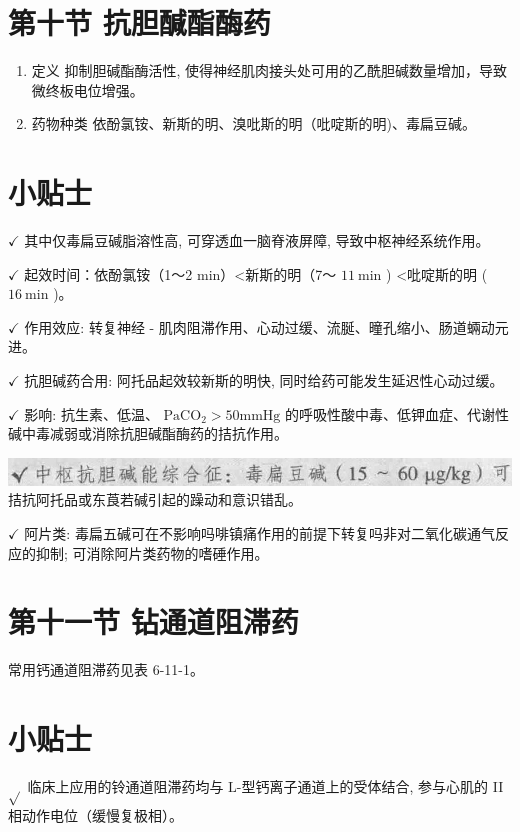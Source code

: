 \documentclass[10pt]{article}
\begin{document}
\section*{第十节 抗胆醎酯酶药}
\begin{enumerate}
  \item 定义 抑制胆碱酯酶活性, 使得神经肌肉接头处可用的乙酰胆碱数量增加，导致微终板电位增强。

  \item 药物种类 依酚氯铵、新斯的明、溴吡斯的明（吡啶斯的明)、毒扁豆碱。

\end{enumerate}

\section*{小贴士}
$\checkmark$ 其中仅毒扁豆碱脂溶性高, 可穿透血一脑脊液屏障, 导致中枢神经系统作用。

$\checkmark$ 起效时间：依酚氯铵（1～2 min）<新斯的明（7～ $11 \mathrm{~min}$ ) <吡啶斯的明 ( $16 \mathrm{~min}$ )。

$\checkmark$ 作用效应: 转复神经 - 肌肉阻滞作用、心动过缓、流脠、曈孔缩小、肠道蜽动元进。

$\checkmark$ 抗胆碱药合用: 阿托品起效较新斯的明快, 同时给药可能发生延迟性心动过缓。

$\checkmark$ 影响: 抗生素、低温、 $\mathrm{PaCO}_{2}>50 \mathrm{mmHg}$ 的呼吸性酸中毒、低钾血症、代谢性碱中毒减弱或消除抗胆碱酯酶药的拮抗作用。

\includegraphics[max width=\textwidth, center]{2024_07_05_645bb794a4d4f32ee0c8g-346}\\
拮抗阿托品或东莨若碱引起的躁动和意识错乱。

$\checkmark$ 阿片类: 毒扁五碱可在不影响吗啡镇痛作用的前提下转复吗非对二氧化碳通气反应的抑制; 可消除阿片类药物的嗜硾作用。

\section*{第十一节 钻通道阻滞药}
常用钙通道阻滞药见表 6-11-1。

\section*{小贴士}
$\sqrt{ }$ 临床上应用的铃通道阻滞药均与 $\mathrm{L}$-型钙离子通道上的受体结合, 参与心肌的 II 相动作电位（缓慢复极相）。
\end{document}
